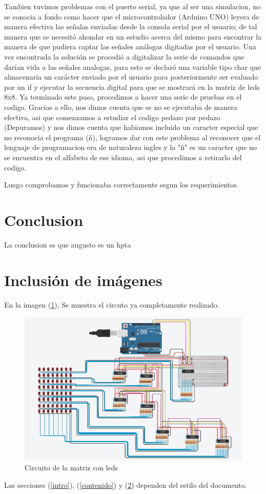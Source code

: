 \documentclass{article}
\begin{document}
Tambien tuvimos problemas con el puerto serial, ya que al ser una simulacion, no se conocia a fondo como hacer que el microcontrolador (Arduino UNO) leyera de manera efectiva las señalas enviadas desde la consola serial por el usuario; de tal manera que se necesitó ahondar en un estudio acerca del mismo para encontrar la manera de que pudiera captar las señales análogas digitadas por el usuario. Una vez encontrada la solución se procedió a digitalizar la serie de comandos que darían vida a las señales analogas, para esto se declaró una variable tipo char que almacenaria un carácter enviado por el usuario para posteriormente ser evaluado por un if y ejecutar la secuencia digital para que se mostrará en la matriz de leds 8x8. 
Ya terminado este paso, procedimos a hacer una serie de pruebas en el codigo. Gracias a ello, nos dimos cuenta que se no se ejecutaba de manera efectiva, asi que comenzamos a estudiar el codigo pedazo por pedazo (Depuramos) y nos dimos cuenta que habiamos incluido un caracter especial que no reconocia el programa (ñ), logramos dar con este problema al reconocer que el lenguaje de programacion era de naturaleza ingles y la "ñ" es un caracter que no se encuentra en el alfabeto de ese idioma, asi que procedimos a retirarlo del codigo. 

Luego comprobamos y funcionaba correctamente segun los requerimientos. 

\section{Conclusion} \label{Conclusion}
La conclusion es que augusto es un hpta 
\section{Inclusión de imágenes} \label{images}
En la imagen (\ref{fig:circuito.PNG}), Se muestra el circuto ya completamente realizado.


\begin{figure}[h]
\includegraphics[scale=0.7]{circuito.PNG}
\graphicspath{ {images/} }
\centering
\caption{Circuito de la matriz con leds}
\label{fig:circuito.PNG}
\end{figure}

Las secciones (\ref{intro}), (\ref{contenido}) y (\ref{images}) dependen del estilo del documento.


\end{document}
